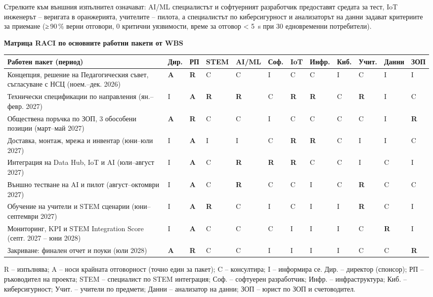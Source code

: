 \documentclass[11pt,a4paper]{article}
\renewcommand{\arraystretch}{1.15}
\begin{document}
{\footnotesize Стрелките към външния изпълнител означават: AI/ML специалистът и софтуерният разработчик предоставят средата за тест, IoT инженерът – веригата в оранжерията, учителите – пилота, а специалистът по киберсигурност и анализаторът на данни задават критериите за приемане (≥\,90\,\% верни отговори, 0 критични уязвимости, време за отговор < 5~s при 30 едновременни потребители).\par}

\medskip
\noindent\begin{minipage}{\textwidth}
\textbf{Матрица RACI по основните работни пакети от WBS}\par\smallskip
{\footnotesize
\setlength{\tabcolsep}{2pt}
\renewcommand{\arraystretch}{1.12}
\newcommand{\Ar}{\cellcolor{navy!18}\textbf{A}}
\newcommand{\Rr}{\cellcolor{teal!18}\textbf{R}}
\begin{tabularx}{\textwidth}{@{}>{\raggedright\arraybackslash}X*{11}{>{\centering\arraybackslash}p{0.88cm}}@{}}
\toprule
\textbf{Работен пакет (период)} & \scriptsize\textbf{Дир.} & \scriptsize\textbf{РП} & \scriptsize\textbf{STEM} & \scriptsize\textbf{AI/ML} & \scriptsize\textbf{Соф.} & \scriptsize\textbf{IoT} & \scriptsize\textbf{Инфр.} & \scriptsize\textbf{Киб.} & \scriptsize\textbf{Учит.} & \scriptsize\textbf{Данни} & \scriptsize\textbf{ЗОП}\\
\midrule
Концепция, решение на Педагогическия съвет, съгласуване с НСЦ (ноем.–дек. 2026) & \Ar & \Rr & C & C & I & C & C & I & C & I & I\\
Технически спецификации по направления (ян.–февр. 2027) & I & \Ar & \Rr & \Rr & C & \Rr & \Rr & C & \Rr & I & C\\
Обществена поръчка по ЗОП, 3 обособени позиции (март–май 2027) & \Ar & \Rr & C & C & I & C & C & C & C & I & \Rr\\
Доставка, монтаж, мрежа и инвентар (юни–юли 2027) & I & \Ar & I & I & C & \Rr & \Rr & C & I & I & C\\
Интеграция на Data Hub, IoT и AI (юли–август 2027) & I & \Ar & C & \Rr & \Rr & \Rr & C & C & I & C & I\\
Външно тестване на AI и пилот (август–октомври 2027) & I & \Ar & C & \Rr & C & C & I & C & \Rr & C & C\\
Обучение на учители и STEM сценарии (юни–септември 2027) & I & \Ar & \Rr & C & I & C & I & I & \Rr & C & I\\
Мониторинг, KPI и STEM Integration Score (септ. 2027 – юни 2028) & I & \Ar & C & C & C & I & I & I & C & \Rr & I\\
Закриване: финален отчет и поуки (юли 2028) & \Ar & \Rr & C & C & I & I & I & I & C & C & \Rr\\
\bottomrule
\end{tabularx}\par}
\smallskip
{\footnotesize R – изпълнява; A – носи крайната отговорност (точно един за пакет); C – консултира; I – информира се. Дир. – директор (спонсор); РП – ръководител на проекта; STEM – специалист по STEM интеграция; Соф. – софтуерен разработчик; Инфр. – инфраструктура; Киб. – киберсигурност; Учит. – учители по предмети; Данни – анализатор на данни; ЗОП – юрист по ЗОП и счетоводител.\par}
\end{minipage}
\clearpage
\end{document}
